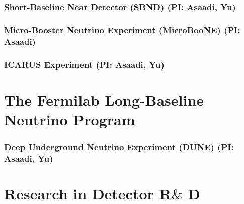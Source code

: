 \documentclass[11pt]{article}
\def\onehead#1{\part{#1}}
\def\twohead#1{\section{#1}}
\begin{document}
\twohead{Short-Baseline Near Detector (SBND) (PI: Asaadi, Yu)}


\twohead{Micro-Booster Neutrino Experiment (MicroBooNE) (PI: Asaadi)}



\twohead{ICARUS Experiment (PI: Asaadi, Yu)}


\onehead{The Fermilab Long-Baseline Neutrino Program}



\twohead{Deep Underground Neutrino Experiment (DUNE) (PI: Asaadi, Yu)}



\newpage

\onehead{Research in Detector R$\&$ D}









%

\newpage
\end{document}
